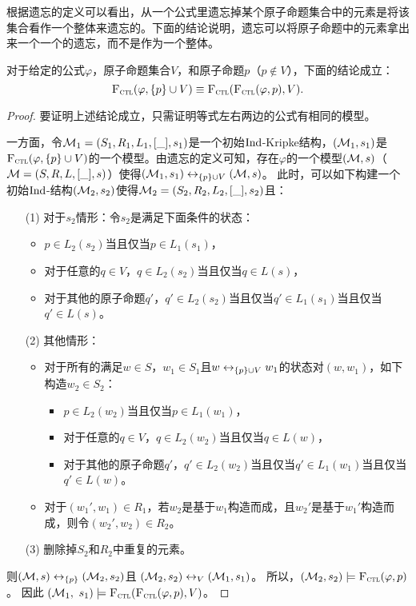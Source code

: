 根据遗忘的定义可以看出，从一个公式里遗忘掉某个原子命题集合中的元素是将该集合看作一个整体来遗忘的。下面的结论说明，遗忘可以将原子命题中的元素拿出来一个一个的遗忘，而不是作为一个整体。
\begin{proposition}\label{disTF}
	对于给定的公式$\varphi$，原子命题集合$V$，和原子命题$p$（$p\not \in V$），下面的结论成立：
	\[
	{\textsc{F}_{\textsc{ctl}}}(\varphi,\{p\}\cup V) \equiv {\textsc{F}_{\textsc{ctl}}}({\textsc{F}_{\textsc{ctl}}}(\varphi,p),V).
	\]
\end{proposition}
\begin{proof}
	要证明上述结论成立，只需证明等式左右两边的公式有相同的模型。
	
	一方面，令${\cal M}_1=(S_1,R_1,L_1,[\_],s_1)$是一个初始$\textrm{Ind}$-Kripke结构，$({\cal M}_1,s_1)$是${\textsc{F}_{\textsc{ctl}}}(\varphi,\{p\}\cup V)$的一个模型。由遗忘的定义可知，存在$\varphi$的一个模型$(
	{\cal M},s)$（${\cal M}=(S,R,L,[\_],s)$）使得$({\cal M}_1,s_1)\leftrightarrow_{\{p\}\cup V} ({\cal M},s)$。
	此时，可以如下构建一个初始$\textrm{Ind}$-结构$({\cal M}_2,s_2)$使得${\cal M}_2=(S_2,R_2,L_2,[\_],s_2)$且：
	\begin{itemize}
		\item[(1)] 对于$s_2$情形：令$s_2$是满足下面条件的状态：
		\begin{itemize}
			\item $p \in L_2(s_2)$当且仅当$p\in L_1(s_1)$，
			\item 对于任意的$q \in V$，$q \in L_2(s_2)$当且仅当$q\in L(s)$，
			\item 对于其他的原子命题$q'$，$q' \in L_2(s_2)$当且仅当$q'\in L_1(s_1)$当且仅当$q'\in L(s)$。
		\end{itemize}
		
		\item[(2)] 其他情形：
		\begin{itemize}
			\item 对于所有的满足$w\in S$，$w_1\in S_1$且$w\leftrightarrow_{\{p\}\cup V} w_1$的状态对$(w,w_1)$，如下构造$w_2\in S_2$：
			\begin{itemize}
				\item $p \in L_2(w_2)$当且仅当$p\in L_1(w_1)$，
				\item 对于任意的$q \in V$，$q \in L_2(w_2)$当且仅当$q\in L(w)$，
				\item 对于其他的原子命题$q'$，$q' \in L_2(w_2)$当且仅当$q'\in L_1(w_1)$当且仅当$q'\in L(w)$。
			\end{itemize}
			\item 对于$(w_1',w_1)\in R_1$，若$w_2$是基于$w_1$构造而成，且$w_2'$是基于$w_1'$构造而成，则令$(w_2',w_2)\in R_2$。
		\end{itemize}
		\item[(3)] 删除掉$S_2$和$R_2$中重复的元素。
	\end{itemize}
	则$({\cal M}, s) \leftrightarrow_{\{p\}} ({\cal M}_2, s_2)$且 $({\cal M}_2, s_2) \leftrightarrow_V ({\cal M}_1, s_1)$。 所以，$({\cal M}_2, s_2) \models {\textsc{F}_{\textsc{ctl}}}(\varphi, p)$。 因此 $({\cal M}_1,$ $s_1) \models {\textsc{F}_{\textsc{ctl}}}({\textsc{F}_{\textsc{ctl}}}(\varphi, p), V)$。
	

\end{proof}
